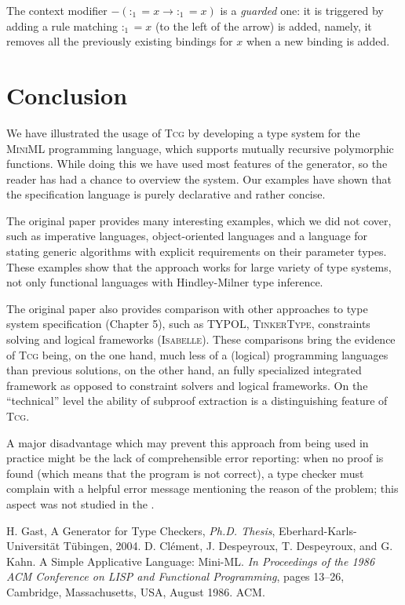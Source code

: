 \documentclass[a4paper,12pt]{article}
\newcommand{\Tcg}{\textsc{Tcg}}
\begin{document}
The context modifier $-(:_1 = x \rightarrow :_1 = x)$ is a \emph{guarded} one: it is triggered by adding a rule matching $:_1 = x$ (to the left of the arrow) is added, namely, it removes all the previously existing bindings for $x$ when a new binding is added.

\section{Conclusion}

We have illustrated the usage of \Tcg{} by developing a type system for the \textsc{MiniML} programming language, which supports mutually recursive polymorphic functions. While doing this we have used most features of the generator, so the reader has had a chance to overview the system. Our examples have shown that the specification language is purely declarative and rather concise.

The original paper \cite{Tcg} provides many interesting examples, which we did not cover, such as imperative languages, object-oriented languages and a language for stating generic algorithms with explicit requirements on their parameter types. These examples show that the approach works for large variety of type systems, not only functional languages with Hindley-Milner type inference. 

The original paper also provides comparison with other approaches to type system specification (Chapter 5), such as TYPOL, \textsc{TinkerType}, constraints solving and logical frameworks (\textsc{Isabelle}). These comparisons bring the evidence of \Tcg{} being, on the one hand, much less of a (logical) programming languages than previous solutions, on the other hand,  an fully specialized integrated framework as opposed to constraint solvers and logical frameworks. On the ``technical'' level the ability of subproof extraction is a distinguishing feature of \Tcg{}.

A major disadvantage which may prevent this approach from being used in practice might be the lack of comprehensible error reporting: when no proof is found (which means that the program is not correct), a type checker must complain with a helpful error message mentioning the reason of the problem; this aspect was not studied in the \cite{Tcg}.

\begin{thebibliography}{99}
	 H. Gast, A Generator for Type Checkers, \textit{Ph.D. Thesis}, Eberhard-Karls-Universit\"at T\"ubingen, 2004.
	 D. Cl\'{e}ment, J. Despeyroux, T. Despeyroux, and G. Kahn. A Simple Applicative Language: Mini-ML. \textit{In Proceedings of the 1986 ACM Conference on LISP and Functional Programming}, pages 13–26, Cambridge, Massachusetts, USA, August 1986. ACM.
\end{thebibliography}
\end{document}
